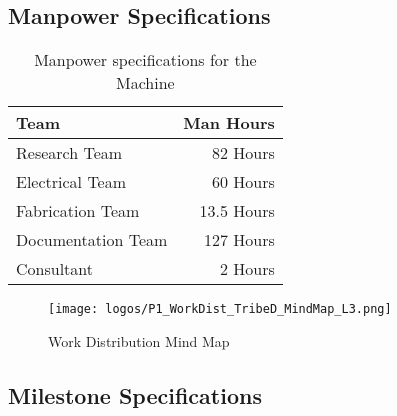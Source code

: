 \documentclass[table,french,english]{rapportCS}
\begin{document}
\subsection{Manpower Specifications}\label{sec:mpspecs}
\begin{table}[h]
\begin{center}
\begin{tabular}{|p{8cm}|r|}

    \hline
    \textbf{Team} & \textbf{Man Hours} \\
    \hline
    Research Team & 82 Hours \\
    \hline
    Electrical Team & 60 Hours \\
    \hline
    Fabrication Team & 13.5 Hours \\
    \hline
    Documentation Team & 127 Hours \\
    \hline
    Consultant & 2 Hours \\
    \hline
\end{tabular}
\caption{Manpower specifications for the Machine}
\end{center}
\end{table}
\begin{figure}[h]
    \centering
    \texttt{[image: logos/P1\_WorkDist\_TribeD\_MindMap\_L3.png]}
    \caption{Work Distribution Mind Map}
    \label{fig:specsmindmap}
\end{figure}

\subsection{Milestone Specifications}\label{sec:msspecs}
\end{document}
